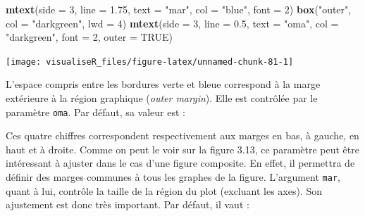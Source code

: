 \documentclass[]{article}
\newenvironment{Shaded}{\begin{snugshade}}{\end{snugshade}}
\newcommand{\CommentTok}[1]{\textcolor[rgb]{0.56,0.35,0.01}{\textit{#1}}}
\newcommand{\DataTypeTok}[1]{\textcolor[rgb]{0.13,0.29,0.53}{#1}}
\newcommand{\DecValTok}[1]{\textcolor[rgb]{0.00,0.00,0.81}{#1}}
\newcommand{\FloatTok}[1]{\textcolor[rgb]{0.00,0.00,0.81}{#1}}
\newcommand{\KeywordTok}[1]{\textcolor[rgb]{0.13,0.29,0.53}{\textbf{#1}}}
\newcommand{\NormalTok}[1]{#1}
\newcommand{\OperatorTok}[1]{\textcolor[rgb]{0.81,0.36,0.00}{\textbf{#1}}}
\newcommand{\OtherTok}[1]{\textcolor[rgb]{0.56,0.35,0.01}{#1}}
\newcommand{\StringTok}[1]{\textcolor[rgb]{0.31,0.60,0.02}{#1}}
\begin{document}
\begin{Shaded}
\begin{Highlighting}[]
\KeywordTok{mtext}\NormalTok{(}\DataTypeTok{side =} \DecValTok{3}\NormalTok{, }\DataTypeTok{line =} \FloatTok{1.75}\NormalTok{, }\DataTypeTok{text =} \StringTok{"mar"}\NormalTok{, }\DataTypeTok{col =} \StringTok{"blue"}\NormalTok{, }\DataTypeTok{font =} \DecValTok{2}\NormalTok{)}
\KeywordTok{box}\NormalTok{(}\StringTok{"outer"}\NormalTok{, }\DataTypeTok{col =} \StringTok{"darkgreen"}\NormalTok{, }\DataTypeTok{lwd =} \DecValTok{4}\NormalTok{)}
\KeywordTok{mtext}\NormalTok{(}\DataTypeTok{side =} \DecValTok{3}\NormalTok{, }\DataTypeTok{line =} \FloatTok{0.5}\NormalTok{, }\DataTypeTok{text =} \StringTok{"oma"}\NormalTok{, }\DataTypeTok{col =} \StringTok{"darkgreen"}\NormalTok{, }\DataTypeTok{font =} \DecValTok{2}\NormalTok{, }\DataTypeTok{outer =} \OtherTok{TRUE}\NormalTok{)}
\end{Highlighting}
\end{Shaded}

\begin{center}\texttt{[image: visualiseR\_files/figure-latex/unnamed-chunk-81-1]} \end{center}

L'espace compris entre les bordures verte et bleue correspond à la marge
extérieure à la région graphique (\emph{outer margin}). Elle est contrôlée par le
paramètre \texttt{oma}. Par défaut, sa valeur est :

\begin{Shaded}
\end{Shaded}

Ces quatre chiffres correspondent respectivement aux marges en bas, à gauche, en haut et à droite. Comme on peut le voir sur la figure 3.13, ce paramètre peut être intéressant à ajuster dans le cas d'une figure composite. En effet, il permettra de définir des marges communes à tous les graphes de la figure.
L'argument \texttt{mar}, quant à lui, contrôle la taille de la région du plot (excluant les axes). Son ajustement est donc très important. Par défaut, il vaut :

\begin{Shaded}
\end{Shaded}
\end{document}
